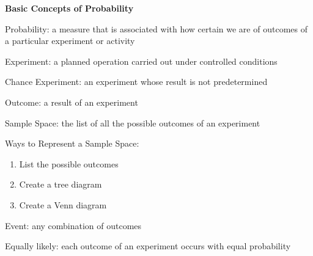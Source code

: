 \begin{center}
\textbf{Basic Concepts of Probability}
\end{center}

\vspace*{1ex}

Probability: a measure that is associated with how certain we are of outcomes of a particular experiment or activity

\vspce

Experiment: a planned operation carried out under controlled conditions

\vspce

Chance Experiment: an experiment whose result is not predetermined

\vspce

Outcome: a result of an experiment 

\vspce

Sample Space: the list of all the possible outcomes of an experiment

\vspce

Ways to Represent a Sample Space: 
\begin{enumerate}[label = \arabic*. ]
\item List the possible outcomes
\item Create a tree diagram
\item Create a Venn
diagram

\end{enumerate}  

\vspce

Event: any combination of outcomes

\vspce

Equally likely: each outcome of an experiment occurs with equal probability

